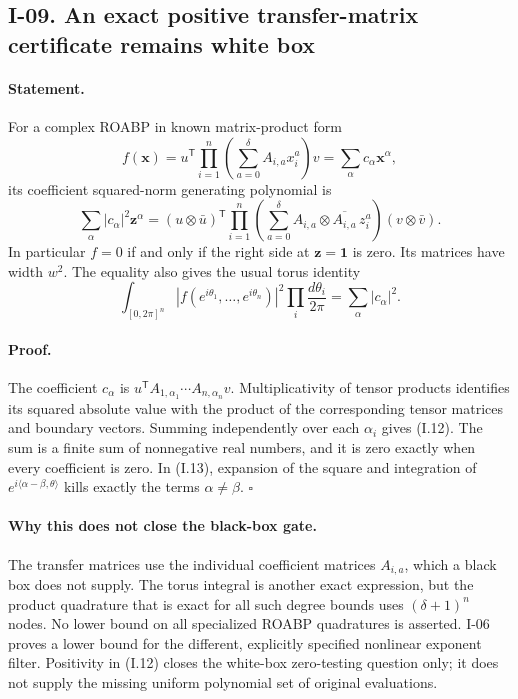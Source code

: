 \subsection{I-09. An exact positive transfer-matrix certificate remains white box}
\label{I-09}

\paragraph{Statement.}
For a complex ROABP in known matrix-product form
\[
 f(\mathbf x)=u^{\mathsf T}\prod_{i=1}^n
                  \left(\sum_{a=0}^{\delta}A_{i,a}x_i^a\right)v
             =\sum_{\alpha}c_{\alpha}\mathbf x^{\alpha},
\]
its coefficient squared-norm generating polynomial is
\[
 \sum_{\alpha}|c_\alpha|^2\mathbf z^\alpha
 = (u\otimes\bar u)^{\mathsf T}
     \prod_{i=1}^n\left(\sum_{a=0}^{\delta}
                    A_{i,a}\otimes\overline{A_{i,a}}\,z_i^a\right)
                     (v\otimes\bar v).
\tag{I.12}
\]
In particular $f=0$ if and only if the right side at
$\mathbf z=\mathbf1$ is zero.  Its matrices have width $w^2$.
The equality also gives the usual torus identity
\[
 \int_{[0,2\pi]^n}|f(e^{i\theta_1},\ldots,e^{i\theta_n})|^2
                \prod_i\frac{d\theta_i}{2\pi}
       =\sum_\alpha|c_\alpha|^2.
\tag{I.13}
\]

\paragraph{Proof.}
The coefficient $c_\alpha$ is
$u^{\mathsf T}A_{1,\alpha_1}\cdots A_{n,\alpha_n}v$.
Multiplicativity of tensor products identifies its squared
absolute value with the product of the corresponding tensor
matrices and boundary vectors.  Summing independently over each
$\alpha_i$ gives (I.12).  The sum is a finite sum of nonnegative
real numbers, and it is zero exactly when every coefficient is
zero.  In (I.13), expansion of the square and integration of
$e^{i\langle\alpha-\beta,\theta\rangle}$ kills exactly the terms
$\alpha\ne\beta$. \hfill$\square$

\paragraph{Why this does not close the black-box gate.}
The transfer matrices use the individual coefficient matrices
$A_{i,a}$, which a black box does not supply.  The torus integral
is another exact expression, but the product quadrature that is
exact for all such degree bounds uses $(\delta+1)^n$ nodes.
No lower bound on all specialized ROABP quadratures is asserted.
I-06 proves a lower bound for the different, explicitly specified
nonlinear exponent filter.  Positivity in (I.12) closes the
white-box zero-testing question only; it does not supply the
missing uniform polynomial set of original evaluations.

